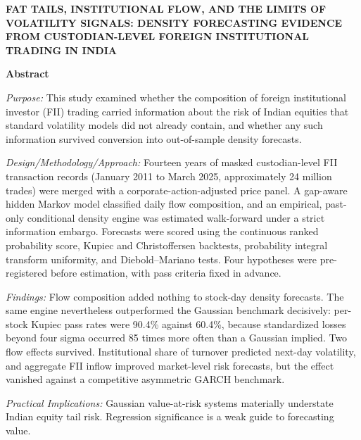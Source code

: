 \documentclass[12pt]{article}
\begin{document}
\sloppy

\begin{center}
{\bfseries FAT TAILS, INSTITUTIONAL FLOW, AND THE LIMITS OF VOLATILITY
SIGNALS: DENSITY FORECASTING EVIDENCE FROM CUSTODIAN-LEVEL FOREIGN
INSTITUTIONAL TRADING IN INDIA}
\end{center}

\vspace{\baselineskip}

\textbf{Abstract}

\emph{Purpose:} This study examined whether the composition of foreign
institutional investor (FII) trading carried information about the risk of
Indian equities that standard volatility models did not already contain, and
whether any such information survived conversion into out-of-sample density
forecasts.

\emph{Design/Methodology/Approach:} Fourteen years of masked custodian-level
FII transaction records (January 2011 to March 2025, approximately 24 million
trades) were merged with a corporate-action-adjusted price panel. A gap-aware
hidden Markov model classified daily flow composition, and an empirical,
past-only conditional density engine was estimated walk-forward under a strict
information embargo. Forecasts were scored using the continuous ranked
probability score, Kupiec and Christoffersen backtests, probability integral
transform uniformity, and Diebold--Mariano tests. Four hypotheses were
pre-registered before estimation, with pass criteria fixed in advance.

\emph{Findings:} Flow composition added nothing to stock-day density forecasts.
The same engine nevertheless outperformed the Gaussian benchmark decisively:
per-stock Kupiec pass rates were 90.4\% against 60.4\%, because standardized
losses beyond four sigma occurred 85 times more often than a Gaussian implied.
Two flow effects survived. Institutional share of turnover predicted next-day
volatility, and aggregate FII inflow improved market-level risk forecasts, but
the effect vanished against a competitive asymmetric GARCH benchmark.

\emph{Practical Implications:} Gaussian value-at-risk systems materially
understate Indian equity tail risk. Regression significance is a weak guide to
forecasting value.
\end{document}
